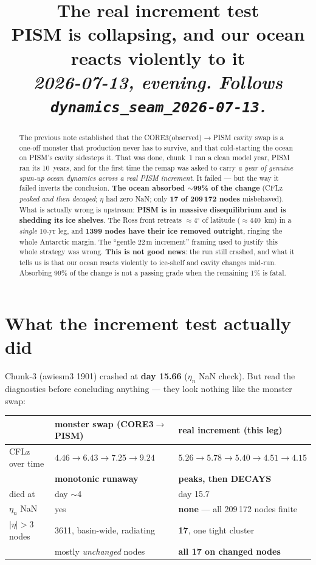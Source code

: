 \documentclass[11pt,a4paper]{article}
\title{\vspace{-1.5em}\textbf{The real increment test}\\[0.2em]
       \large PISM is collapsing, and our ocean reacts violently to it\\[0.3em]
       \normalsize\textit{2026-07-13, evening. Follows \texttt{dynamics\_seam\_2026-07-13}.}}
\author{}
\date{}
\begin{document}
\maketitle
\vspace{-2.5em}

\begin{abstract}
\noindent
The previous note established that the CORE3(observed)$\to$PISM cavity swap is a one-off monster
that production never has to survive, and that cold-starting the ocean on PISM's cavity sidesteps
it. That was done, chunk~1 ran a clean model year, PISM ran its 10~years, and for the first time
the remap was asked to carry \emph{a year of genuine spun-up ocean dynamics across a real PISM
increment}. It failed --- but the way it failed inverts the conclusion. \textbf{The ocean absorbed
$\sim$99\% of the change} (CFLz \emph{peaked and then decayed}; $\eta$ had zero NaN; only
\textbf{17 of 209\,172 nodes} misbehaved). What is actually wrong is upstream: \textbf{PISM is in
massive disequilibrium and is shedding its ice shelves}. The Ross front retreats $\approx$4$^\circ$
of latitude ($\approx$440~km) in a \emph{single} 10-yr leg, and \textbf{1399 nodes have their ice
removed outright}, ringing the whole Antarctic margin. The ``gentle 22\,m increment'' framing used
to justify this whole strategy was wrong.
\textbf{This is not good news}: the run still crashed, and what it tells us is that our ocean reacts
violently to ice-shelf and cavity changes mid-run. Absorbing 99\% of the change is not a passing
grade when the remaining 1\% is fatal.
\end{abstract}

\section{What the increment test actually did}

Chunk-3 (awiesm3 1901) crashed at \textbf{day 15.66} ($\eta_n$ NaN check). But read the diagnostics
before concluding anything --- they look nothing like the monster swap:

\begin{center}
\begin{tabular}{@{}lll@{}}
\toprule
 & \textbf{monster swap} (CORE3$\to$PISM) & \textbf{real increment} (this leg) \\
\midrule
CFLz over time & $4.46 \to 6.43 \to 7.25 \to 9.24$ & $5.26 \to \mathbf{5.78} \to 5.40 \to 4.51 \to \mathbf{4.15}$ \\
               & \textbf{monotonic runaway} & \textbf{peaks, then DECAYS} \\
died at        & day $\sim$4 & day 15.7 \\
$\eta_n$ NaN   & yes & \textbf{none} --- all 209\,172 nodes finite \\
$|\eta|>3$ nodes & 3611, basin-wide, radiating & \textbf{17}, one tight cluster \\
 & mostly \emph{unchanged} nodes & \textbf{all 17 on changed nodes} \\
\bottomrule
\end{tabular}
\end{center}
\end{document}
